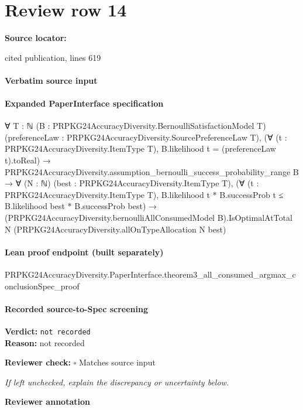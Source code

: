 \documentclass[10pt]{article}
\newcommand{\reviewerbox}{%
  \par\noindent\fbox{\parbox{0.96\linewidth}{\rule{0pt}{0.38in}}}\par
}
\newcommand{\reviewmatch}[1]{%
  \par\noindent\textbf{Reviewer check:} $\square$\; #1\par
  \noindent\emph{If left unchecked, explain the discrepancy or uncertainty below.}\par
}
\begin{document}
\section*{Review row 14}
\textbf{Source locator:} {\footnotesize\raggedright cited publication, lines 619\par}
\paragraph{Verbatim source input}
\begin{ReviewVerbatim}
\end{ReviewVerbatim}


\paragraph{Expanded PaperInterface specification}
\begin{ReviewVerbatim}
∀ {T : ℕ} (B : PRPKG24AccuracyDiversity.BernoulliSatisfactionModel T)
  (preferenceLaw : PRPKG24AccuracyDiversity.SourcePreferenceLaw T),
  (∀ (t : PRPKG24AccuracyDiversity.ItemType T), B.likelihood t = (preferenceLaw t).toReal) →
    PRPKG24AccuracyDiversity.assumption_bernoulli_success_probability_range B →
      ∀ (N : ℕ) (best : PRPKG24AccuracyDiversity.ItemType T),
        (∀ (t : PRPKG24AccuracyDiversity.ItemType T),
            B.likelihood t * B.successProb t ≤ B.likelihood best * B.successProb best) →
          (PRPKG24AccuracyDiversity.bernoulliAllConsumedModel B).IsOptimalAtTotal N
            (PRPKG24AccuracyDiversity.allOnTypeAllocation N best)
\end{ReviewVerbatim}

\paragraph{Lean proof endpoint (built separately)}\begin{ReviewVerbatim}
PRPKG24AccuracyDiversity.PaperInterface.theorem3_all_consumed_argmax_conclusionSpec_proof
\end{ReviewVerbatim}

\paragraph{Recorded source-to-Spec screening}
\textbf{Verdict:} \texttt{not recorded}
\\
\textbf{Reason:} not recorded
\reviewmatch{Matches source input}
\noindent\textbf{Reviewer annotation}\par
\reviewerbox
\clearpage
\hypertarget{source-claim-e8b459af037ff529}{}
\end{document}
